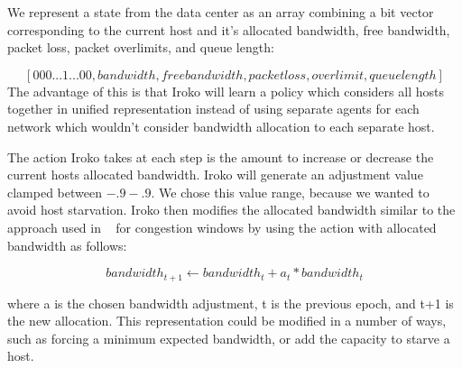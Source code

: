 We represent a state from the data center as an array combining a bit vector corresponding to the current host and it's allocated bandwidth, free bandwidth, packet loss, packet overlimits, and queue length:

\[ [0 0 0 ... 1 ... 0 0, bandwidth, free bandwidth, packet loss, overlimit, queue length ] \]
The advantage of this is that Iroko will learn a policy which considers all hosts together in unified representation instead of using separate agents for each network which wouldn't consider bandwidth allocation to each separate host.

The action Iroko takes at each step is the amount to increase or decrease the current hosts allocated bandwidth. Iroko will generate an adjustment value clamped between $-.9 - .9$. We chose this value range, because we wanted to avoid host starvation.  Iroko then modifies the allocated bandwidth similar to the approach used in ~\cite{remy} for congestion windows by using the action with allocated bandwidth as follows:

\[bandwidth_{t+1}   \leftarrow bandwidth_t +  a_t * bandwidth_t\]

where a is the chosen bandwidth adjustment, t is the previous epoch, and t+1 is the new allocation. This representation could be  modified in a number of ways, such as forcing a minimum expected bandwidth, or add the capacity to starve a host.



